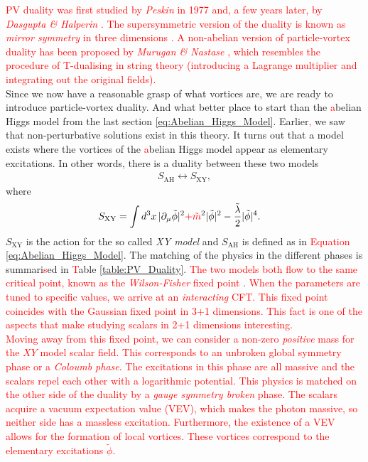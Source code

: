     \indent \textcolor{red}{PV duality was first studied by \textit{Peskin} \cite{Peskin:1977kp} in 1977 and, a few years later, by \textit{Dasgupta \& Halperin} \cite{Dasgupta:1981zz}. The supersymmetric version of the duality is known as \textit{mirror symmetry} in three dimensions \cite{Intriligator:1996ex}. A non-abelian version of particle-vortex duality has been proposed by \textit{Murugan \& Nastase} \cite{Murugan:2015boa}, which resembles the procedure of T-dualising in string theory (introducing a Lagrange multiplier and integrating out the original fields).  }\\
    \indent Since we now have a reasonable grasp of what vortices are, we are ready to introduce particle-vortex duality. And what better place to start than the \textcolor{red}{a}belian Higgs model from the last section \eqref{eq:Abelian_Higgs_Model}. Earlier\textcolor{red}{,} we saw that non-perturbative solutions exist in this theory. It turns out that a model exists where the vortices of the \textcolor{red}{a}belian Higgs model appear as elementary excitations. In other words, there is a duality between these two models
    \begin{align}
        S_{\text{AH}} \longleftrightarrow S_{\text{XY}}, \label{eq:PV-duality_Tong}
    \end{align}
    where
    \begin{align}
        S_{\text{XY}} &= \int d^3x \, |\partial_{\mu}\tilde{\phi}|^2\textcolor{red}{+}\textcolor{red}{\tilde{m}}^2 |\tilde{\phi}|^2 - \frac{\tilde{\lambda}}{2} |\tilde{\phi}|^4.
    \end{align}
    $S_{\text{XY}}$ is the action for the so called \textit{XY model} and $S_{\text{AH}}$ is defined as in \textcolor{red}{Equation} \eqref{eq:Abelian_Higgs_Model}. The matching of the physics in the different phases is summari\textcolor{red}{s}ed in \textcolor{red}{T}able \eqref{table:PV_Duality}. \textcolor{red}{The two models both flow to the same critical point, known as the \textit{Wilson-Fisher} fixed point \cite{Wilson:1971dc}. When the parameters are tuned to specific values, we arrive at an \textit{interacting} CFT. This fixed point coincides with the Gaussian fixed point in 3+1 dimensions. This fact is one of the aspects that make studying scalars in 2+1 dimensions interesting.}\\
    \indent \textcolor{red}{Moving away from this fixed point, we can consider a non-zero \textit{positive} mass for the $XY$ model scalar field. This corresponds to an unbroken global symmetry phase or a \textit{Coloumb phase}. The excitations in this phase are all massive and the scalars repel each other with a logarithmic potential. This physics is matched on the other side of the duality by a \textit{gauge symmetry broken} phase. The scalars acquire a vacuum expectation value (VEV), which makes the photon massive, so neither side has a massless excitation. Furthermore, the existence of a VEV allows for the formation of local vortices. These vortices correspond to the elementary excitations $\tilde{\phi}$.}\\
